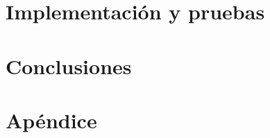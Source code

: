 \documentclass[twoside,spanish,a4paper,12pt]{tfg}
\begin{document}
\chapter{Implementación y pruebas}

\chapter{Conclusiones}




\pagestyle{appendix}

\appendix
\chapter{Apéndice}




\end{document}
